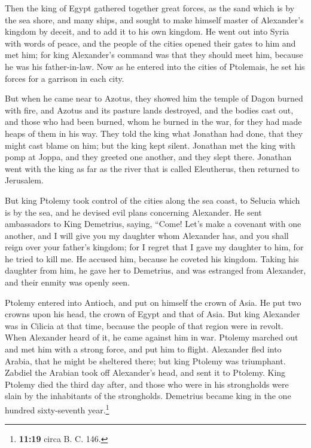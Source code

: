  Then the king of Egypt gathered together great forces, as
the sand which is by the sea shore, and many ships, and sought to make
himself master of Alexander's kingdom by deceit, and to add it to his
own kingdom.  He went out into Syria with words of peace,
and the people of the cities opened their gates to him and met him; for
king Alexander's command was that they should meet him, because he was
his father-in-law.  Now as he entered into the cities of
Ptolemais, he set his forces for a garrison in each city.

 But when he came near to Azotus, they showed him the
temple of Dagon burned with fire, and Azotus and its pasture lands
destroyed, and the bodies cast out, and those who had been burned, whom
he burned in the war, for they had made heaps of them in his way.
 They told the king what Jonathan had done, that they
might cast blame on him; but the king kept silent. 
Jonathan met the king with pomp at Joppa, and they greeted one another,
and they slept there.  Jonathan went with the king as far
as the river that is called Eleutherus, then returned to Jerusalem.

 But king Ptolemy took control of the cities along the sea
coast, to Selucia which is by the sea, and he devised evil plans
concerning Alexander.  He sent ambassadors to King
Demetrius, saying, ``Come! Let's make a covenant with one another, and I
will give you my daughter whom Alexander has, and you shall reign over
your father's kingdom;  for I regret that I gave my
daughter to him, for he tried to kill me.  He accused
him, because he coveted his kingdom.  Taking his daughter
from him, he gave her to Demetrius, and was estranged from Alexander,
and their enmity was openly seen.

 Ptolemy entered into Antioch, and put on himself the
crown of Asia. He put two crowns upon his head, the crown of Egypt and
that of Asia.  But king Alexander was in Cilicia at that
time, because the people of that region were in revolt. 
When Alexander heard of it, he came against him in war. Ptolemy marched
out and met him with a strong force, and put him to flight.
 Alexander fled into Arabia, that he might be sheltered
there; but king Ptolemy was triumphant.  Zabdiel the
Arabian took off Alexander's head, and sent it to Ptolemy.
 King Ptolemy died the third day after, and those who
were in his strongholds were slain by the inhabitants of the
strongholds.  Demetrius became king in the one hundred
sixty-seventh year.\footnote{\textbf{11:19} circa B. C. 146.}

